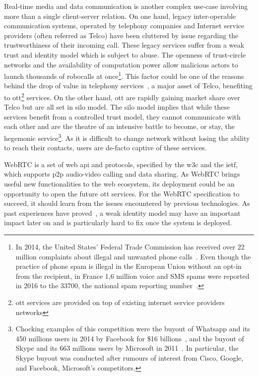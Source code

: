 Real-time media and data communication is another complex use-case involving more than a single client-server relation.
On one hand, legacy inter-operable communication systems, operated by telephony companies and Internet service providers (often referred as Telco) have been cluttered by issue regarding the trustworthiness of their incoming call.
These legacy services suffer from a weak trust and identity model which is subject to abuse.
The openness of trust-circle networks and the availability of computation power allow malicious actors to launch thousands of robocalls at once\footnote{In 2014, the United States' Federal Trade Commission has received over 22 million complaints about illegal and unwanted phone calls~\cite{tu2016sok}.
Even though the practice of phone spam is illegal in the European Union without an opt-in from the recipient, in France 1,6 million voice and SMS spams were reported in 2016 to the 33700, the national spam reporting number~\cite{33700}.}.
This factor could be one of the reasons behind the drop of value in telephony services~\cite{arcep_observatoire}, a major asset of Telco, benefiting to \gls{ott}\footnote{\gls{ott} services are provided on top of existing internet service providers networks} services.
On the other hand, \gls{ott} are rapidly gaining market share over Telco but are all set in silo model.
The silo model implies that while these services benefit from a controlled trust model, they cannot communicate with each other and are the theatre of an intensive battle to become, or stay, the hegemonic service\footnote{Chocking examples of this competition were the buyout of Whatsapp and its 450 millions users in 2014 by Facebook for \$16 billions~\cite{goel_facebook}, and the buyout of Skype and its 663 millions users by Microsoft in 2011~\cite{rosoff_microsoft}. In particular, the Skype buyout was conducted after rumours of interest from Cisco, Google, and Facebook, \ie Microsoft's competitors.}.
As it is difficult to change network without losing the ability to reach their contacts, users are de-facto captive of these services.

WebRTC is a set of web \gls{api} and protocols, specified by the \gls{w3c} and the \gls{ietf}, which supports \gls{p2p} audio-video calling and data sharing.
As WebRTC brings useful new functionalities to the web ecosystem, its deployment could be an opportunity to open the future \gls{ott} services.
For the WebRTC specification to succeed, it should learn from the issues encountered by previous technologies.
As past experiences have proved~\cite{RFC5039}, a weak identity model may have an important impact later on and is particularly hard to fix once the system is deployed.

